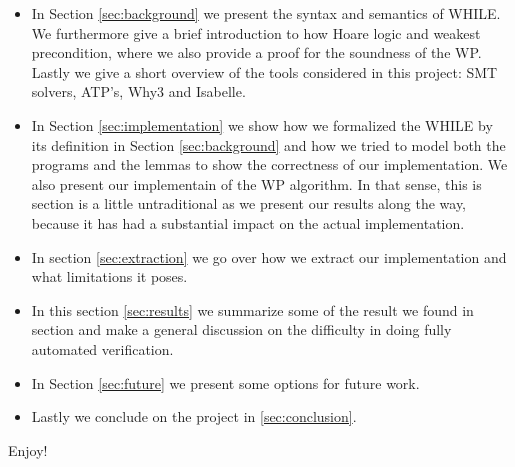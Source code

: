 \begin{itemize}
  \item In Section \ref{sec:background} we present the syntax and semantics of WHILE.
        We furthermore give a brief introduction to how Hoare logic and weakest precondition, where we also provide a proof for the soundness of the WP.
        Lastly we give a short overview of the tools considered in this project: SMT solvers, ATP's, Why3 and Isabelle.
  \item In Section \ref{sec:implementation} we show how we formalized the WHILE by its definition in Section \ref{sec:background} and how we tried to model both the programs and the lemmas to show the correctness of our implementation. We also present our implementain of the WP algorithm.
        In that sense, this is section is a little untraditional as we present our results along the way, because it has had a substantial impact on the actual implementation.
  \item In section \ref{sec:extraction} we go over how we extract our implementation and what limitations it poses.
  \item In this section \ref{sec:results} we summarize some of the result we found in section and make a general discussion on the difficulty in doing fully automated verification.
  \item In Section \ref{sec:future} we present some options for future work.
  \item Lastly we conclude on the project in \ref{sec:conclusion}.
\end{itemize}

Enjoy!